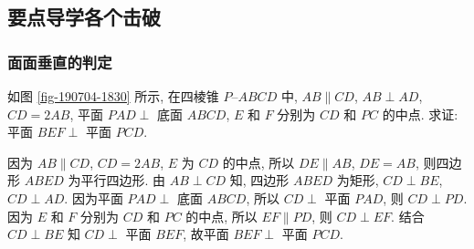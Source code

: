 \subsection{要点导学\quad 各个击破}
\subsubsection{面面垂直的判定}
\begin{example}
    如图 \ref{fig-190704-1830} 所示, 在四棱锥 $P\text{--}ABCD$ 中, $AB\parallel CD$, $AB\perp AD$, $CD=2AB$, 平面 $PAD\perp$ 底面 $ABCD$, $E$ 和 $F$ 分别为 $CD$ 和 $PC$ 的中点. 求证: 平面 $BEF\perp$ 平面 $PCD$.
\end{example}
\beginsolution
    因为 $AB\parallel CD$, $CD=2AB$, $E$ 为 $CD$ 的中点, 所以 $DE\parallel AB$, $DE=AB$, 则四边形 $ABED$ 为平行四边形. 由 $AB\perp CD$ 知, 四边形 $ABED$ 为矩形, $CD\perp BE$, $CD\perp AD$. 因为平面 $PAD\perp$ 底面 $ABCD$, 所以 $CD\perp$ 平面 $PAD$, 则 $CD\perp PD$. 因为 $E$ 和 $F$ 分别为 $CD$ 和 $PC$ 的中点, 所以 $EF\parallel PD$, 则 $CD\perp EF$. 结合 $CD\perp BE$ 知 $CD\perp$ 平面 $BEF$, 故平面 $BEF\perp$ 平面 $PCD$.
\endsolution


